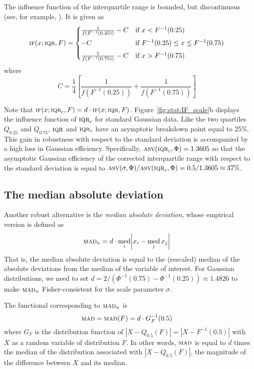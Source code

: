 The influence function of the interquartile range is bounded, but discontinuous
(see, for example, \citealp[p. 35–36]{wilcox:2005}). It is given as
\[
    \stsc{IF}(x; \stsc{IQR}, F) =
    \begin{cases}
        \frac{1}{f\left(F^{-1}(0.25)\right)} - C & \text{if $x < F^{-1}(0.25)$}\\[1ex]
        -C                                       & \text{if $F^{-1}(0.25) \leq x \leq F^{-1}(0.75)$}\\[1ex]
        \frac{1}{f\left(F^{-1}(0.75)\right)} - C & \text{if $x > F^{-1}(0.75)$}
    \end{cases}
\]
where 
\[
    C = \frac{1}{4} \left[\frac{1}{f\left(F^{-1}(0.25)\right)} + \frac{1}{f\left(F^{-1}(0.75)\right)}\right]
\]

Note that $\stsc{IF}(x; \stsc{IQR}_c, F) = d \cdot \stsc{IF}(x;
\stsc{IQR}, F)$. Figure~\ref{fig:stat:IF_scale}b displays the influence
function of $\stsc{IQR}_c$ for standard Gaussian data. Like the two quartiles
$Q_{0.25}$ and $Q_{0.75}$, $\stsc{IQR}$ and $\stsc{IQR}_c$ have an
asymptotic breakdown point equal to 25\%. This gain in robustness with respect
to the standard deviation is accompanied by a high loss in Gaussian
efficiency. Specifically, $\stsc{ASV}(\stsc{IQR}_c, \Phi) = 1.3605$ so that      
the asymptotic Gaussian efficiency of the corrected interquartile range with
respect to the standard deviation is equal to $\stsc{ASV}(\sigma, \Phi) /
\stsc{ASV}(\stsc{IQR}_c, \Phi) = 0.5/1.3605 \approx 37\%$.


\subsection{The median absolute deviation}

Another robust alternative is the \emph{median absolute deviation}, whose
empirical version is defined as
\[
    \stsc{MAD}_n = d \cdot \med_i\left|x_i-\med_j x_j\right|
\]
That is, the median absolute deviation is equal to the (rescaled) median of the
absolute deviations from the median of the variable of interest. For Gaussian
distributions, we need to set $d = 2 / \left(\Phi^{-1}(0.75) -
\Phi^{-1}(0.25)\right) \approx 1.4826$ to make $\stsc{MAD}_n$
Fisher-consistent for the scale parameter $\sigma$.

The functional corresponding to $\stsc{MAD}_n$ is 
\[
    \stsc{MAD} = \stsc{MAD}(F) = d \cdot G_{F}^{-1}(0.5)
\]
where $G_{F}$ is the distribution function of $|X-Q_{0.5}(F)| = |X-F^{-1}(0.5)|$ 
with $X$ as a random variable of distribution $F$. In other
words, $\stsc{MAD}$ is equal to $d$ times the median of the distribution
associated with $|X-Q_{0.5}(F)|$, the magnitude of the difference between $X$
and its median.

